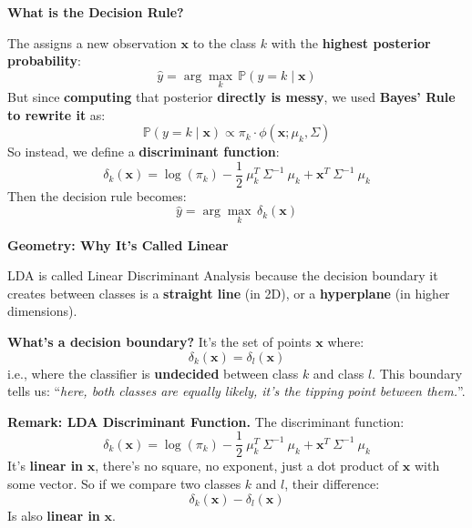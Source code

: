 \highspace
\begin{flushleft}
    \textcolor{Green3}{ \textbf{What is the Decision Rule?}}
\end{flushleft}
The  assigns a new observation $\mathbf{x}$ to the class $k$ with the \textbf{highest posterior probability}:
\begin{equation}
    \hat{y} = \arg\max_{k} \, \mathbb{P}\left(y = k \mid \mathbf{x}\right)
\end{equation}
But since \textbf{computing} that posterior \textbf{directly is messy}, we used \textbf{Bayes' Rule to rewrite it} as:
\begin{equation*}
    \mathbb{P}\left(y = k \mid \mathbf{x}\right) \propto \pi_{k} \cdot \phi\left(\mathbf{x}; \mu_k, \Sigma\right)
\end{equation*}
So instead, we define a \textbf{discriminant function}:
\begin{equation*}
    \delta_{k}\left(\mathbf{x}\right) = \log\left(\pi_{k}\right) - \frac{1}{2} \: \mu_{k}^{T} \: \Sigma^{-1} \: \mu_{k} + \mathbf{x}^{T} \: \Sigma^{-1} \: \mu_{k}
\end{equation*}
Then the decision rule becomes:
\begin{equation}
    \hat{y} = \arg\max_{k} \, \delta_{k}\left(\mathbf{x}\right)
\end{equation}

\highspace
\begin{flushleft}
    \textcolor{Green3}{ \textbf{Geometry: Why It's Called Linear}}
\end{flushleft}
LDA is called Linear Discriminant Analysis because the decision boundary it creates between classes is a \textbf{straight line} (in 2D), or a \textbf{hyperplane} (in higher dimensions).

\highspace
\textcolor{Green3}{ \textbf{What's a decision boundary?}} It's the set of points $\mathbf{x}$ where:
\begin{equation*}
    \delta_{k}\left(\mathbf{x}\right) = \delta_{l}\left(\mathbf{x}\right)
\end{equation*}
i.e., where the classifier is \textbf{undecided} between class $k$ and class $l$. This boundary tells us: ``\emph{here, both classes are equally likely, it's the tipping point between them.}''.

\highspace
\textcolor{Green3}{ \textbf{Remark: LDA Discriminant Function.}} The discriminant function:
\begin{equation*}
    \delta_{k}\left(\mathbf{x}\right) = \log\left(\pi_{k}\right) - \frac{1}{2} \: \mu_{k}^{T} \: \Sigma^{-1} \: \mu_{k} + \mathbf{x}^{T} \: \Sigma^{-1} \: \mu_{k}
\end{equation*}
It's \textbf{linear in} $\mathbf{x}$, there's no square, no exponent, just a dot product of $\mathbf{x}$ with some vector. So if we compare two classes $k$ and $l$, their difference:
\begin{equation*}
    \delta_{k}\left(\mathbf{x}\right) - \delta_{l}\left(\mathbf{x}\right)
\end{equation*}
Is also \textbf{linear in} $\mathbf{x}$.


